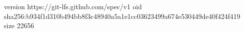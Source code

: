 version https://git-lfs.github.com/spec/v1
oid sha256:b934f1d310b494bb8f3c48940a5a1e1cc03623499a674e530449de40f424f419
size 22656
